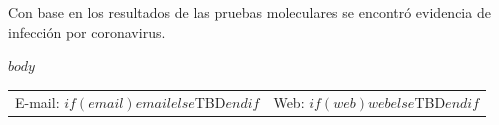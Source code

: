 \documentclass[$if(fontsize)$$fontsize$,$endif$$if(lang)$$babel-lang$,$endif$$if(papersize)$$papersize$,$endif$$for(classoption)$$classoption$$sep$,$endfor$]{article}
\begin{document}
\vspace{5mm}

\begin{Form}
Con base en los resultados de las pruebas moleculares  se encontró evidencia de infección por coronavirus.
\end{Form}



$body$


\vspace{50mm}


{\selectfont
\noindent \begin{tabular*}{\textwidth}{ @{\extracolsep{\fill}} lr @{\extracolsep{\fill}}}
\hline
E-mail: $if(email)$\texttt{$email$}$else$TBD$endif$ & Web: $if(web)$\href{http://$web$}{\tt $web$}$else$TBD$endif$  \end{tabular*}
}
\end{document}
